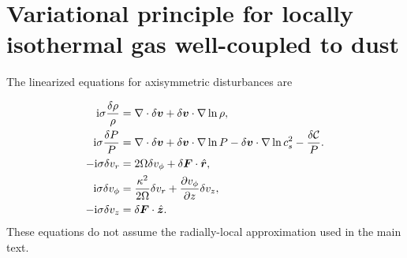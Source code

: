 \section{Variational principle for locally isothermal gas
  well-coupled to dust}\label{var_prin}

The linearized equations for axisymmetric disturbances are 

\begin{align}
  \mathrm{i}\sigma\frac{\delta\rho}{\rho} &= \nabla\cdot\delta\bm{v} +
  \delta\bm{v}\cdot\nabla\ln{\rho},\label{lin_mass_full}\\
 \mathrm{i}\sigma\frac{\delta P}{P} &= \nabla\cdot\delta\bm{v} +
  \delta\bm{v}\cdot\nabla\ln{P} - \delta\bm{v}\cdot\nabla\ln{c_s^2} - \frac{\delta\mathcal{C}}{P}.\label{lin_energy_full}\\
  -\mathrm{i}\sigma\delta v_r  &= 2\Omega\delta v_\phi + 
  \delta\bm{F}\cdot\hat{\bm{r}},\\
  \mathrm{i}\sigma\delta v_\phi &= \frac{\kappa^2}{2\Omega}\delta v_r + \frac{\partial
    v_\phi}{\partial z}\delta v_z,\\
  -\mathrm{i}\sigma\delta v_z &=  \delta\bm{F}\cdot\hat{\bm{z}}.
\end{align}  
These equations do not assume the radially-local approximation used in
the main text. 

